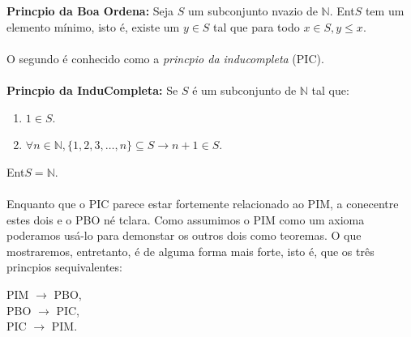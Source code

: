 {\bf Princ\ih pio da Boa Ordena\caoi:} Seja $S$ um subconjunto n\ao vazio de $\mathbb{N}$. Ent\ao $S$ tem um elemento m\'inimo, isto \'e, existe um $y\in S$ tal que para todo $x\in S, y\leq x$.
\\
\\

O segundo \'e conhecido como a {\it princ\ih pio da indu\cao completa} (PIC).
\\
\\

{\bf Princ\ih pio da Indu\cao Completa:} Se $S$ \'e um subconjunto de $\mathbb{N}$ tal que:
\begin{enumerate}[{\bf a)}]
\item $1\in S$.
\item $\forall n\in \mathbb{N}, \{1,2,3,\ldots,n\}\subseteq S \rightarrow n+1\in S$. 
\end{enumerate}
Ent\ao $S=\mathbb{N}$. 
\\
\\

Enquanto que o PIC parece estar fortemente relacionado ao PIM, a conec\cao entre estes dois e o PBO n\ao \'e t\ao clara. Como assumimos o PIM como um axioma poder\ih amos us\'a-lo para demonstar os outros dois como teoremas. O que mostraremos, entretanto, \'e de alguma forma mais forte, isto \'e, que os tr\^es princ\ih pios s\ao equivalentes:
\begin{center}
PIM $\to$ PBO, \\
PBO $\to$ PIC, \\
PIC $\to$ PIM. \\
\end{center}


